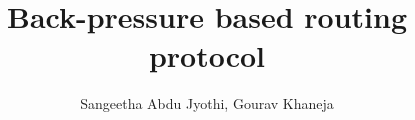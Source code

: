 \documentclass[12pt, a4paper]{article}
\begin{document}
\title{\bf{Back-pressure based routing protocol}}
\author{Sangeetha Abdu Jyothi, Gourav Khaneja}
\date{}
\maketitle


\bigskip
\bigskip

\bigskip
\bigskip

\bigskip
\bigskip

\bigskip
\bigskip


\end{document}
